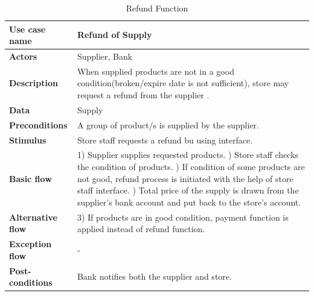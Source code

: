  \begin{table}[H]
     \centering
     \begin{tabular}{ | l | p{10cm} |}
     \hline
     \textbf{Use case name}    & Refund of Supply \\
     \hline
     \textbf{Actors}           & Supplier, Bank \\
     \hline
     \textbf{Description}      & When supplied products are not in a good condition(broken/expire date is not sufficient), store may request a refund from the supplier .\\
     \hline
     \textbf{Data}             & Supply  \\
     \hline
     \textbf{Preconditions}    & A group of product/s is supplied by the supplier. \\
     \hline
     \textbf{Stimulus}         & Store staff requests a refund bu using interface. \\
     \hline
     \textbf{Basic flow}       & 1) Supplier supplies requested products. \newline 2) Store staff checks the condition of products. \newline 3) If condition of some products are not good, refund process is initiated with the help of store staff interface. \newline 4) Total price of the supply is drawn from the supplier's bank account and put back to the store's account.\\
     \hline
     \textbf{Alternative flow} & 3) If products are in good condition, payment function is applied instead of refund function. \\
     \hline
     \textbf{Exception flow}   & -\\
     \hline
     \textbf{Post-conditions}  & Bank notifies both the supplier and store. \\
     \hline
     \end{tabular} \caption{Refund Function}
     \label{tab:12refund}
 \end{table}

